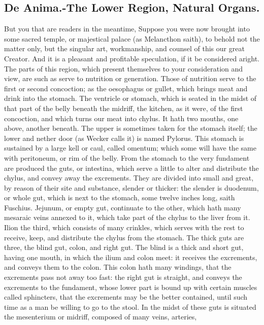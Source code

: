 {\subsection[The Lower Region]{De Anima.-The Lower Region, Natural Organs.}
But you that are readers in the meantime, Suppose you were now brought into some sacred temple,
or majestical palace (as Melancthon saith), to behold not the
matter only, but the singular art, workmanship, and counsel of this our
great Creator. And it is a pleasant and profitable speculation, if it
be considered aright. The parts of this region, which present
themselves to your consideration and view, are such as serve to
nutrition or generation. Those of nutrition serve to the first or
second concoction; as the oesophagus or gullet, which brings meat and
drink into the stomach. The ventricle or stomach, which is seated in
the midst of that part of the belly beneath the midriff, the kitchen,
as it were, of the first concoction, and which turns our meat into
chylus. It hath two mouths, one above, another beneath. The upper is
sometimes taken for the stomach itself; the lower and nether door (as
Wecker calls it) is named Pylorus. This stomach is sustained by a large
kell or caul, called omentum; which some will have the same with
peritoneum, or rim of the belly. From the stomach to the very fundament
are produced the guts, or intestina, which serve a little to alter and
distribute the chylus, and convey away the excrements. They are divided
into small and great, by reason of their site and substance, slender or
thicker: the slender is duodenum, or whole gut, which is next to the
stomach, some twelve inches long, saith  Fuschius. Jejunum, or
empty gut, continuate to the other, which hath many mesaraic veins
annexed to it, which take part of the chylus to the liver from it.
Ilion the third, which consists of many crinkles, which serves with the
rest to receive, keep, and distribute the chylus from the stomach. The
thick guts are three, the blind gut, colon, and right gut. The blind is
a thick and short gut, having one mouth, in which the ilium and colon
meet: it receives the excrements, and conveys them to the colon. This
colon hath many windings, that the excrements pass not away too fast:
the right gut is straight, and conveys the excrements to the fundament,
whose lower part is bound up with certain muscles called sphincters,
that the excrements may be the better contained, until such time as a
man be willing to go to the stool. In the midst of these guts is
situated the mesenterium or midriff, composed of many veins, arteries,
}
